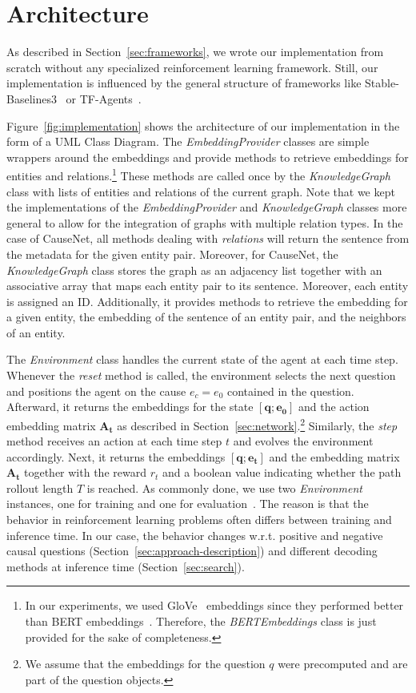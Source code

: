 \section{Architecture}
\label{sec:architecture}

As described in Section~\ref{sec:frameworks}, we wrote our implementation from scratch without any 
specialized reinforcement learning framework. Still, our implementation is influenced by the 
general structure of frameworks like Stable-Baselines3~\cite{Raffin2021Stable} or 
TF-Agents~\cite{Guadarrama2018TFAgents}.

Figure~\ref{fig:implementation} shows the architecture of our implementation in the form of a UML Class Diagram.
The \textit{EmbeddingProvider} classes are simple wrappers around the embeddings and provide 
methods to retrieve embeddings for entities and relations.\footnote{In our experiments, we used GloVe~\cite{Pennington2014Glove} embeddings since they performed better than BERT embeddings~\cite{Liu2019Roberta}. Therefore, the \textit{BERTEmbeddings} class is just provided for the sake of completeness.} 
These methods are called once by the \textit{KnowledgeGraph} class with lists of entities 
and relations of the current graph.
Note that we kept the implementations of the \textit{EmbeddingProvider} and \textit{KnowledgeGraph} classes more general to allow for the integration 
of graphs with multiple relation types. In the case of CauseNet, all methods dealing with \textit{relations} will 
return the sentence from the metadata for the given entity pair. Moreover, for CauseNet, the 
\textit{KnowledgeGraph} class stores the graph as an adjacency list together with an associative array that 
maps each entity pair to its sentence. Moreover, each entity is assigned an ID. Additionally, it provides methods to retrieve the embedding for a given entity, 
the embedding of the sentence of an entity pair, and the neighbors of an entity. 

The \textit{Environment} class handles the current state of the agent at each time step.
Whenever the \textit{reset} method is called, the environment selects the next question and positions 
the agent on the cause $e_c = e_0$ contained in the question. Afterward, it returns the embeddings for 
the state $[\mathbf{q};\mathbf{e_0}]$ and the action embedding matrix $\mathbf{A_t}$ as described in 
Section~\ref{sec:network}.\footnote{We assume that the embeddings for the question $q$ were precomputed and are part of the question objects.} Similarly, the \textit{step} method receives an action at each time step $t$ and evolves the 
environment accordingly. Next, it returns the embeddings $[\mathbf{q};\mathbf{e_t}]$ and the embedding matrix $\mathbf{A_t}$ together 
with the reward $r_t$ and a boolean value indicating whether the path rollout length $T$ is reached.
As commonly done, we use two \textit{Environment} instances, one for training and one for 
evaluation~\cite{Guadarrama2018TFAgents, Liang2018rllib, Raffin2021Stable}.
The reason is that the behavior in reinforcement learning problems often differs between 
training and inference time. In our case, the behavior changes w.r.t. positive and negative causal questions (Section~\ref{sec:approach-description}) 
and different decoding methods at inference time (Section~\ref{sec:search}).

